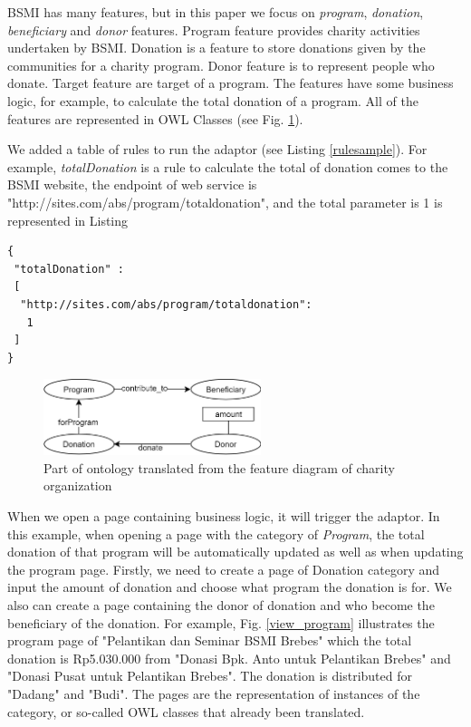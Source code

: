 \documentclass[conference]{IEEEtran}
\begin{document}
BSMI has many features, but in this paper we focus on \textit{program}, \textit{donation}, \textit{beneficiary} and \textit{donor} features. Program feature provides charity activities undertaken by BSMI. Donation is a feature to store donations given by the communities for a charity program. Donor feature is to represent people who donate. Target feature are target of a program. The features have some business logic, for example, to calculate the total donation of a program. All of the features are represented in OWL Classes (see Fig. \ref{fig_ontaisco}).

We added a table of rules to run the adaptor (see Listing \ref{rulesample}). For example, \textit{totalDonation} is a rule to calculate the total of donation comes to the BSMI website, the endpoint of web service is "http://sites.com/abs/program/totaldonation", and the total parameter is 1 is represented in Listing 

\begin{lstlisting}[caption=Example of table of rules, label = rulesample]
{
 "totalDonation" :
 [
  "http://sites.com/abs/program/totaldonation":
   1 
 ]
}
\end{lstlisting}

\begin{figure}[!t]
\centering
\includegraphics[width=2.5in]{OntologyofCO}

\caption{Part of ontology translated from the feature diagram of charity organization \cite{bravyto}}
\label{fig_ontaisco}
\end{figure}

%

When we open a page containing business logic, it will trigger the adaptor. In this example, when opening a page with the category of \textit{Program}, the total donation of that program will be automatically updated as well as when updating the program page. Firstly, we need to create a page of Donation category and input the amount of donation and choose what program the donation is for. We also can create a page containing the donor of donation and who become the beneficiary of the donation. For example, Fig. \ref{view_program} illustrates the program page of "Pelantikan dan Seminar BSMI Brebes" which the total donation is Rp5.030.000 from "Donasi Bpk. Anto untuk Pelantikan Brebes" and "Donasi Pusat untuk Pelantikan Brebes". The donation is distributed for "Dadang" and "Budi". The pages are the representation of instances of the category, or so-called OWL classes that already been translated. 
\end{document}

